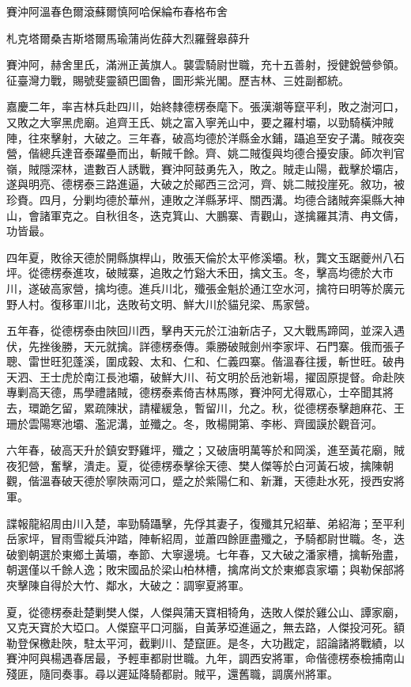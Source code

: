 
\begin{pinyinscope}
賽沖阿溫春色爾滾蘇爾慎阿哈保綸布春格布舍

札克塔爾桑吉斯塔爾馬瑜蒲尚佐薛大烈羅聲皋薛升

賽沖阿，赫舍里氏，滿洲正黃旗人。襲雲騎尉世職，充十五善射，授健銳營參領。征臺灣力戰，賜號斐靈額巴圖魯，圖形紫光閣。歷吉林、三姓副都統。

嘉慶二年，率吉林兵赴四川，始終隸德楞泰麾下。張漢潮等竄平利，敗之澍河口，又敗之大寧黑虎廟。追齊王氏、姚之富入寧羌山中，要之羅村壩，以勁騎橫沖賊陣，往來擊射，大破之。三年春，破高均德於洋縣金水鋪，躡追至安子溝。賊夜突營，偕總兵達音泰躍壘而出，斬賊千餘。齊、姚二賊復與均德合擾安康。師次判官嶺，賊隱深林，遣數百人誘戰，賽沖阿鼓勇先入，敗之。賊走山陽，截擊於壩店，遂與明亮、德楞泰三路進逼，大破之於鄖西三岔河，齊、姚二賊投崖死。敘功，被珍賚。四月，分剿均德於華州，連敗之洋縣茅坪、關西溝。均德合諸賊奔渠縣大神山，會諸軍克之。自秋徂冬，迭克箕山、大鵬寨、青觀山，遂擒羅其清、冉文儔，功皆最。

四年夏，敗徐天德於開縣旗桿山，敗張天倫於太平修溪壩。秋，龔文玉踞夔州八石坪。從德楞泰進攻，破賊寨，追敗之竹谿大禾田，擒文玉。冬，擊高均德於大市川，遂破高家營，擒均德。進兵川北，殲張金魁於通江空水河，擒符曰明等於廣元野人村。復移軍川北，迭敗茍文明、鮮大川於貓兒梁、馬家營。

五年春，從德楞泰由陜回川西，擊冉天元於江油新店子，又大戰馬蹄岡，並深入遇伏，先挫後勝，天元就擒。詳德楞泰傳。乘勝破賊劍州李家坪、石門寨。俄而張子聰、雷世旺犯蓬溪，圍成穀、太和、仁和、仁義四寨。偕溫春往援，斬世旺。破冉天泗、王士虎於南江長池壩，破鮮大川、茍文明於岳池新場，擢固原提督。命赴陜專剿高天德，馬學禮諸賊，德楞泰素倚吉林馬隊，賽沖阿尤得眾心，士卒聞其將去，環跪乞留，累疏陳狀，請權緩急，暫留川，允之。秋，從德楞泰擊趙麻花、王珊於雲陽寒池壩、濫泥溝，並殲之。冬，敗楊開第、李彬、齊國謨於觀音河。

六年春，破高天升於鎮安野雞坪，殲之；又破唐明萬等於和岡溪，進至黃花廟，賊夜犯營，奮擊，潰走。夏，從德楞泰擊徐天德、樊人傑等於白河黃石坡，擒陳朝觀，偕溫春破天德於寧陜兩河口，蹙之於紫陽仁和、新灘，天德赴水死，授西安將軍。

諜報龍紹周由川入楚，率勁騎躡擊，先俘其妻子，復殲其兄紹華、弟紹海；至平利岳家坪，冒雨雪縱兵沖踏，陣斬紹周，並蕭四餘匪盡殲之，予騎都尉世職。冬，迭破劉朝選於東鄉土黃壩，奉節、大寧邊境。七年春，又大破之潘家槽，擒斬殆盡，朝選僅以千餘人逸；敗宋國品於梁山柏林槽，擒席尚文於東鄉袁家壩；與勒保部將夾擊陳自得於大竹、鄰水，大破之：調寧夏將軍。

夏，從德楞泰赴楚剿樊人傑，人傑與蒲天寶相犄角，迭敗人傑於雞公山、譚家廟，又克天寶於大埡口。人傑竄平口河腦，自黃茅埡進逼之，無去路，人傑投河死。額勒登保檄赴陜，駐太平河，截剿川、楚竄匪。是冬，大功戡定，詔論諸將戰績，以賽沖阿與楊遇春居最，予輕車都尉世職。九年，調西安將軍，命偕德楞泰檢捕南山殘匪，隨同奏事。尋以遲延降騎都尉。賊平，還舊職，調廣州將軍。


\end{pinyinscope}
